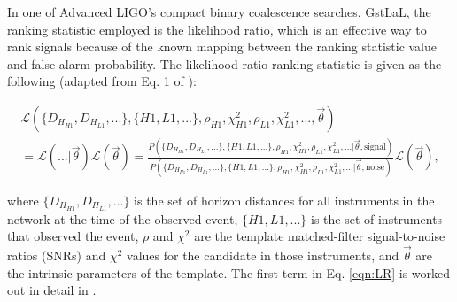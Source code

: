 \documentclass[twocolumn,showpacs,unsortedaddress,superscriptaddress,showkeys,nofootinbib,preprintnumbers,letterpaper]{revtex4-1}
\begin{document}
In one of Advanced LIGO's compact binary coalescence searches, GstLaL, the ranking statistic employed is the likelihood ratio, which is an effective way to rank signals because of the known mapping between the ranking statistic value and false-alarm probability. The likelihood-ratio ranking statistic is given as the following (adapted from Eq. 1 of \cite{2015arXiv150404632C}):
	\begin{widetext}
	\begin{multline}
	\label{eqn:LR}
	\mathcal{L}(\{D_{H_{H1}}, D_{H_{L1}}, ...\}, \{H1, L1, ...\}, \rho_{H1}, \chi^2_{H1}, \rho_{L1}, \chi^2_{L1}, ..., \vec{\theta}) \\
	= \mathcal{L}(...| \vec{\theta}) \mathcal{L}(\vec{\theta}) = \frac{P(\{D_{H_{H1}}, D_{H_{L1}}, ...\}, \{H1, L1, ...\}, \rho_{H1}, \chi^2_{H1}, \rho_{L1}, \chi^2_{L1}, ... | \vec{\theta}, \text{signal})}{P(\{D_{H_{H1}}, D_{H_{L1}}, ...\}, \{H1, L1, ...\}, \rho_{H1}, \chi^2_{H1}, \rho_{L1}, \chi^2_{L1}, ... | \vec{\theta}, \text{noise})} \mathcal{L}(\vec{\theta}), 
	\end{multline}
	\end{widetext}
where $\{D_{H_{H1}}, D_{H_{L1}}, ...\}$ is the set of horizon distances for all instruments in the network at the time of the observed event, $\{H1, L1, ...\}$ is the set of instruments that observed the event, $\rho$ and $\chi^2$ are the template matched-filter signal-to-noise ratios (SNRs) and $\chi^2$ values for the candidate in those instruments, and $\vec{\theta}$ are the intrinsic parameters of the template. The first term in Eq. \ref{eqn:LR} is worked out in detail in \cite{2015arXiv150404632C}.
\end{document}
